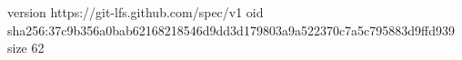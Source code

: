 version https://git-lfs.github.com/spec/v1
oid sha256:37c9b356a0bab62168218546d9dd3d179803a9a522370c7a5c795883d9ffd939
size 62
